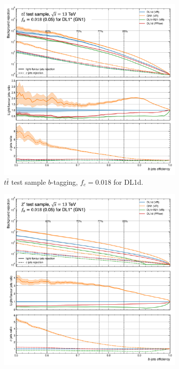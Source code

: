 \hspace{-0.4cm}
\begin{figure}
  \vspace{0.6cm}
  \begin{subfigure}[t]{0.32\textwidth}
    \centering
    \includegraphics[width=\textwidth]{Images/FTAG/VRDL1d/ROC/ttb.png}
    \caption{$t\bar{t}$ test sample $b$-tagging, $f_c = 0.018$ for DL1d.}
    \label{fig:dl1dVRROCtt}
  \end{subfigure}
  \hfill
  \begin{subfigure}[t]{0.32\textwidth}
    \centering
    \includegraphics[width=\textwidth]{Images/FTAG/VRDL1d/ROC/zpb.png}

\end{subfigure}
\end{figure}
